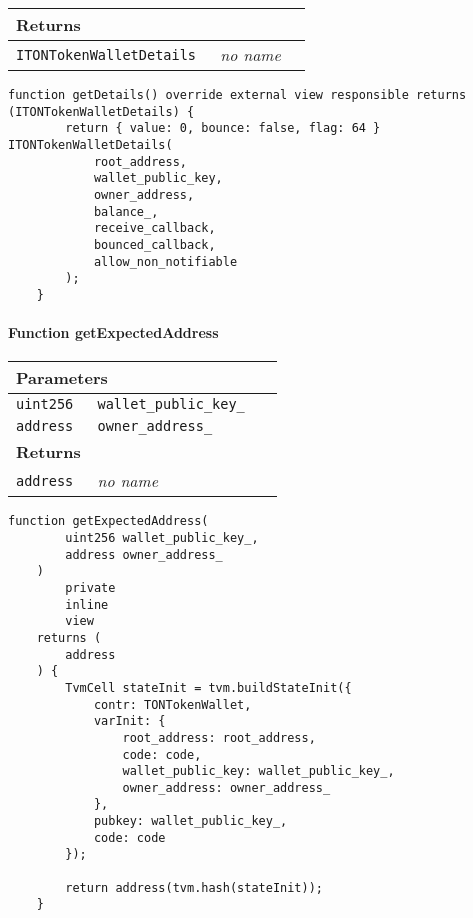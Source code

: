 \ifsoltables
\noindent\begin{tabular}{|l|l|p{5cm}|}\hline
\multicolumn{3}{|l|}{\bf Returns}\\\hline
\tt ITONTokenWalletDetails & {\em no name} &\\\hline
\end{tabular}
\fi

\vspace{2cm}

\begin{lstlisting}[firstnumber=72]
    function getDetails() override external view responsible returns (ITONTokenWalletDetails) {
        return { value: 0, bounce: false, flag: 64 } ITONTokenWalletDetails(
            root_address,
            wallet_public_key,
            owner_address,
            balance_,
            receive_callback,
            bounced_callback,
            allow_non_notifiable
        );
    }
\end{lstlisting}

\paragraph{Function getExpectedAddress}


\ifsoltables
\noindent\begin{tabular}{|l|l|p{5cm}|}\hline
\multicolumn{3}{|l|}{\bf Parameters}\\\hline
\tt uint256 & \tt wallet\_{}public\_{}key\_{} &\\\hline
\tt address & \tt owner\_{}address\_{} &\\\hline
\multicolumn{3}{|l|}{\bf Returns}\\\hline
\tt address & {\em no name} &\\\hline
\end{tabular}
\fi

\vspace{2cm}

\begin{lstlisting}[firstnumber=620]
    function getExpectedAddress(
        uint256 wallet_public_key_,
        address owner_address_
    )
        private
        inline
        view
    returns (
        address
    ) {
        TvmCell stateInit = tvm.buildStateInit({
            contr: TONTokenWallet,
            varInit: {
                root_address: root_address,
                code: code,
                wallet_public_key: wallet_public_key_,
                owner_address: owner_address_
            },
            pubkey: wallet_public_key_,
            code: code
        });

        return address(tvm.hash(stateInit));
    }
\end{lstlisting}

